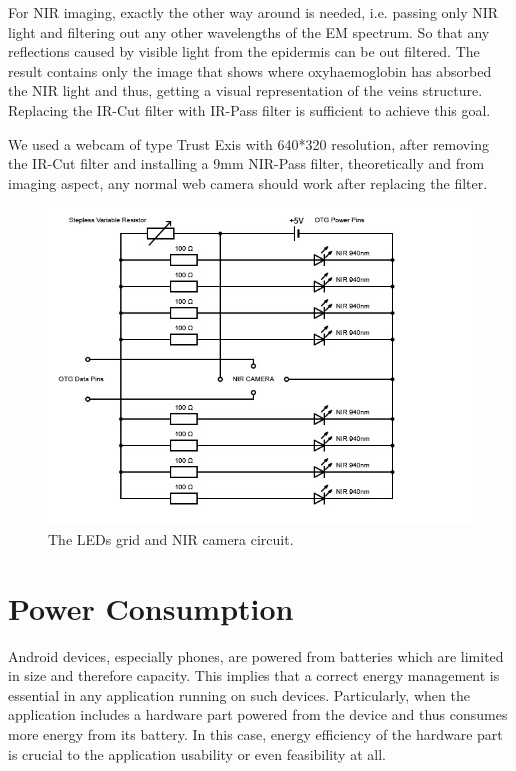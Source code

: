 For NIR imaging, exactly the other way around is needed, i.e. passing only NIR light and filtering out any other wavelengths of the EM spectrum. So that any reflections caused by visible light from the epidermis can be out filtered. The result contains only the image that shows where oxyhaemoglobin has absorbed the NIR light and thus, getting a visual representation of the veins structure. Replacing the IR-Cut filter with IR-Pass filter is sufficient to achieve this goal.

We used a  webcam of type Trust Exis with 640*320 resolution, after removing the IR-Cut filter and installing a 9mm NIR-Pass filter, theoretically and from imaging aspect, any normal web camera should work after replacing the filter.

\begin{figure}[H]
\centering
\includegraphics{figures/circuit.jpg}
\caption[The LEDs grid and NIR camera circuit]{The LEDs grid and NIR camera circuit.}\label{fig:circuit}
\end{figure}


\section{Power Consumption}
Android devices, especially phones, are powered from batteries which are limited in size and therefore capacity. This implies that a correct energy management is essential in any application running on such devices. Particularly, when the application includes a hardware part powered from the device and thus consumes more energy from its battery. In this case, energy efficiency of the hardware part is crucial to the application usability or even feasibility at all.

